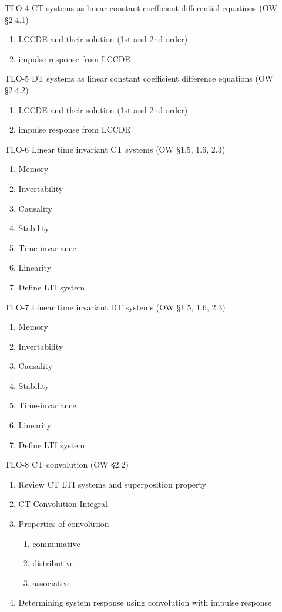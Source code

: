 \begin{enumerate}
\item[TLO-4] CT systems as linear constant coefficient differential equations (OW \S 2.4.1)
  \begin{enumerate}
  \item LCCDE and their solution (1st and 2nd order)
  \item impulse response from LCCDE
  \end{enumerate}
  
\item[TLO-5] DT systems as linear constant coefficient difference equations (OW \S 2.4.2)
  \begin{enumerate}
  \item LCCDE and their solution (1st and 2nd order)
  \item impulse response from LCCDE
  \end{enumerate}
  
\item[TLO-6] Linear time invariant CT systems (OW \S 1.5, 1.6, 2.3)
  \begin{enumerate}
  \item Memory
  \item Invertability
  \item Causality
  \item Stability
  \item Time-invariance
  \item Linearity
  \item Define LTI system
  \end{enumerate}

\item[TLO-7] Linear time invariant DT systems (OW \S 1.5, 1.6, 2.3)
  \begin{enumerate}
  \item Memory
  \item Invertability
  \item Causality
  \item Stability
  \item Time-invariance
  \item Linearity
  \item Define LTI system
  \end{enumerate}

\item[TLO-8] CT convolution (OW \S 2.2)
  \begin{enumerate}
  \item Review CT LTI systems and superposition property
  \item CT Convolution Integral
  \item Properties of convolution
    \begin{enumerate}
    \item communative 
    \item distributive
    \item associative
    \end{enumerate}
  \item Determining system response using convolution with impulse response
  \end{enumerate}


\end{enumerate}
